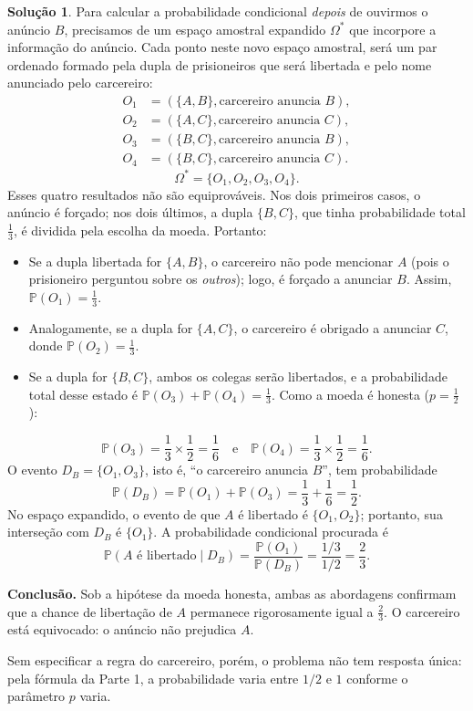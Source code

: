 \documentclass[12pt,portuguese]{article}
\theoremstyle{definition}
\newtheorem*{solution}{Solução}
\begin{document}
\begin{solution}
Para calcular a probabilidade condicional \emph{depois} de ouvirmos o anúncio \(B\), precisamos de um espaço amostral expandido \(\Omega^*\) que incorpore a informação do anúncio. 
Cada ponto neste novo espaço amostral, será um par ordenado formado pela 
dupla de prisioneiros que será libertada e pelo nome anunciado pelo carcereiro:
\[
  \begin{aligned}
    O_1 &= (\{A,B\}, \text{carcereiro anuncia } B), \\
    O_2 &= (\{A,C\}, \text{carcereiro anuncia } C), \\
    O_3 &= (\{B,C\}, \text{carcereiro anuncia } B), \\
    O_4 &= (\{B,C\}, \text{carcereiro anuncia } C).
  \end{aligned}
\]
\[
  \Omega^* = \{O_1,O_2,O_3,O_4\}.
\]
Esses quatro resultados não são equiprováveis. Nos dois primeiros casos, o anúncio é forçado; nos dois últimos, a dupla \(\{B,C\}\), que tinha probabilidade total \(\tfrac{1}{3}\), é dividida pela escolha da moeda. Portanto:
\begin{itemize}
  \item Se a dupla libertada for \(\{A,B\}\), o carcereiro não pode mencionar \(A\) (pois o prisioneiro perguntou sobre os \emph{outros}); logo, é forçado a anunciar \(B\). Assim, \(\mathbb{P}(O_1) = \tfrac{1}{3}\).
  \item Analogamente, se a dupla for \(\{A,C\}\), o carcereiro é obrigado a anunciar \(C\), donde \(\mathbb{P}(O_2) = \tfrac{1}{3}\).
  \item Se a dupla for \(\{B,C\}\), ambos os colegas serão libertados, e a probabilidade total desse estado é \(\mathbb{P}(O_3) + \mathbb{P}(O_4) = \tfrac{1}{3}\). Como a moeda é honesta (\(p = \tfrac{1}{2}\)):
\end{itemize}
\[
  \mathbb{P}(O_3) = \frac{1}{3} \times \frac{1}{2} = \frac{1}{6}
  \quad \text{e} \quad
  \mathbb{P}(O_4) = \frac{1}{3} \times \frac{1}{2} = \frac{1}{6}.
\]
O evento \(D_B = \{O_1,O_3\}\), isto é, ``o carcereiro anuncia \(B\)'', tem probabilidade
\[
  \mathbb{P}(D_B) = \mathbb{P}(O_1) + \mathbb{P}(O_3) = \frac{1}{3} + \frac{1}{6} = \frac{1}{2}.
\]
No espaço expandido, o evento de que \(A\) é libertado é \(\{O_1,O_2\}\); portanto, sua interseção com \(D_B\) é \(\{O_1\}\). A probabilidade condicional procurada é
\[
  \mathbb{P}(A \text{ é libertado} \mid D_B) = \frac{\mathbb{P}(O_1)}{\mathbb{P}(D_B)} = \frac{1/3}{1/2} = \frac{2}{3}.
\]

\smallskip
\noindent\textbf{Conclusão.}
Sob a hipótese da moeda honesta, ambas as abordagens confirmam que a chance de libertação de \(A\) permanece rigorosamente igual a \(\tfrac{2}{3}\). O carcereiro está equivocado: o anúncio não prejudica \(A\). 

Sem especificar a regra do carcereiro, porém, o problema não tem resposta única: pela fórmula da 
Parte 1, a probabilidade varia entre $1/2$ e $1$ conforme o parâmetro \(p\) varia.
\end{solution}
\end{document}
